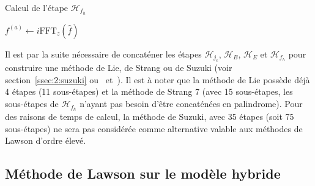 \begin{algorithm}
  \caption{Calcul de l'étape $\mathcal{H}_{f_h}$}
  \label{alg:Hfh}
  \begin{algorithmic}[1]
      \State $f^{(a)} \gets i\text{FFT}_z(\hat{f})$
      \State {}
      \State {}
      \State {}
    \EndFunction
  \end{algorithmic}
\end{algorithm}

Il est par la suite nécessaire de concaténer les étapes $\mathcal{H}_{j_c}$, $\mathcal{H}_{B}$, $\mathcal{H}_{E}$ et $\mathcal{H}_{f_h}$ pour construire une méthode de Lie, de Strang ou de Suzuki (voir section~\ref{ssec:2:suzuki} ou~\cite{Suzuki:1990} et~\cite{Blanes:2019}). Il est à noter que la méthode de Lie possède déjà 4 étapes (11 sous-étapes) et la méthode de Strang 7 (avec 15 sous-étapes, les sous-étapes de $\mathcal{H}_{f_h}$ n'ayant pas besoin d'être concaténées en palindrome). Pour des raisons de temps de calcul, la méthode de Suzuki, avec 35 étapes (soit 75 sous-étapes) ne sera pas considérée comme alternative valable aux méthodes de Lawson d'ordre élevé.



\FloatBarrier
\subsection{Méthode de Lawson sur le modèle hybride}

